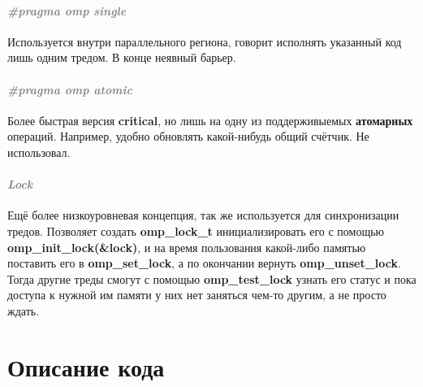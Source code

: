 \documentclass{article}
\begin{document}
\paragraph{\textcolor{gray}{\textit{\LARGE{\#pragma omp single}}}}
Используется внутри параллельного региона, говорит исполнять указанный код лишь одним тредом. В конце неявный барьер.
\paragraph{\textcolor{gray}{\textit{\LARGE{\#pragma omp atomic}}}}
Более быстрая версия \textbf{critical}, но лишь на одну из поддерживыемых \textbf{атомарных} операций. Например, удобно обновлять какой-нибудь общий счётчик. Не использовал.
\paragraph{\textcolor{gray}{\textit{\LARGE{Lock}}}}
Ещё более низкоуровневая концепция, так же используется для синхронизации тредов. Позволяет создать \textbf{omp\_lock\_t} инициализировать его с помощью \textbf{omp\_init\_lock(\&lock)}, и на время пользования какой-либо памятью поставить его в \textbf{omp\_set\_lock}, а по окончании вернуть \textbf{omp\_unset\_lock}. Тогда другие треды смогут с помощью \textbf{omp\_test\_lock} узнать его статус и пока доступа к нужной им памяти у них нет заняться чем-то другим, а не просто ждать.

\section{Описание кода}
\end{document}
